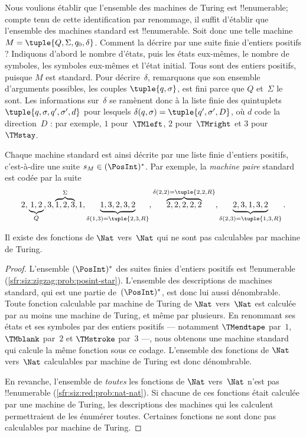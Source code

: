\documentclass[../../../include/open-logic-section]{subfiles}
\begin{document}
\begin{explain}
Nous voulions établir que l'ensemble des machines de Turing est
!!{enumerable}; compte tenu de cette identification par renommage,
il suffit d'établir que l'ensemble des machines standard est
!!{enumerable}. Soit donc une telle
machine $M = \tuple{Q, \Sigma, q_0, \delta}$. Comment la décrire
par une suite finie d'entiers positifs ? Indiquons d'abord le
nombre d'états, puis les états eux-mêmes, le nombre de symboles,
les symboles eux-mêmes et l'état initial. Tous sont des entiers
positifs, puisque $M$ est standard. Pour décrire~$\delta$,
remarquons que son ensemble d'arguments possibles, les couples
$\tuple{q,\sigma}$, est fini parce que $Q$ et~$\Sigma$ le sont.
Les informations sur~$\delta$ se ramènent donc à la liste finie
des quintuplets
$\tuple{q, \sigma, q', \sigma', d}$ pour lesquels
$\delta(q,\sigma) = \tuple{q', \sigma', D}$, où $d$ code
la direction~$D$ : par exemple, $1$ pour~$\TMleft$,
$2$ pour~$\TMright$ et $3$ pour~$\TMstay$.

Chaque machine standard est ainsi décrite par une liste finie
d'entiers positifs, c'est-à-dire une suite $s_M \in
(\PosInt)^*$. Par exemple, la \emph{machine paire} standard est
codée par la suite
\[
2, \underbrace{1, 2}_Q, 3, \overbrace{1, 2, 3}^\Sigma, 1, \underbrace{1, 3, 2, 3, 2}_{\delta(1,3) = \tuple{2,3,R}},
\overbrace{2, 2, 2, 2, 2}^{\delta(2,2) = \tuple{2,2,R}},
\underbrace{2, 3, 1, 3, 2}_{\delta(2,3) = \tuple{1,3,R}}.
\]
\end{explain}

\begin{thm}
Il existe des fonctions de $\Nat$ vers~$\Nat$ qui ne sont
pas calculables par machine de Turing.
\end{thm}

\begin{proof}
L'ensemble $(\PosInt)^*$ des suites finies d'entiers positifs
est !!{enumerable} (\cref{sfr:siz:zigzag:prob:posint-star}).
L'ensemble des descriptions de machines standard, qui est une
partie de~$(\PosInt)^*$, est donc lui aussi dénombrable. Toute fonction
calculable par machine de Turing de $\Nat$ vers~$\Nat$ est
calculée par au moins une machine de Turing, et même par
plusieurs. En renommant ses états et ses symboles par des
entiers positifs --- notamment $\TMendtape$ par~$1$,
$\TMblank$ par~$2$ et $\TMstroke$ par~$3$ ---, nous obtenons
une machine standard qui calcule la même fonction sous ce
codage. L'ensemble des fonctions de $\Nat$ vers~$\Nat$
calculables par machine de Turing est donc dénombrable.

En revanche, l'ensemble de \emph{toutes} les fonctions de
$\Nat$ vers~$\Nat$ n'est pas !!{enumerable}
(\cref{sfr:siz:red:prob:nat-nat}). Si chacune de ces fonctions
était calculée par une machine de Turing, les descriptions
des machines qui les calculent permettraient de les énumérer
toutes. Certaines fonctions ne sont donc pas calculables par
machine de Turing.
\end{proof}
\end{document}

